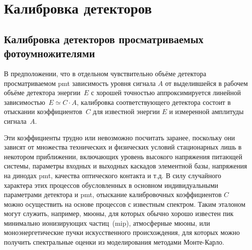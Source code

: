 \section{Калибровка детекторов}

\subsection{Калибровка детекторов просматриваемых фотоумножителями}

В предположении, что в отдельном чувствительно объёме детектора
просматриваемом \acrshort{pmt} зависимость уровня сигнала $A$ от
выделившейся в рабочем объёме детектора энергии~$E$ с хорошей
точностью аппроксимируется линейной
зависимостью~$E \simeq C \cdot A$,
калибровка соответствующего детектора состоит в отыскании
коэффициентов~$C$ для известной энергии $E$ и измеренной амплитуды
сигнала~$A$.

Эти коэффициенты трудно или невозможно посчитать заранее, поскольку
они зависят от множества технических и физических условий стационарных
лишь в некотором приближении, включающих уровень высокого напряжения
питающей системы, параметры входных и выходных каскадов элементной
базы, напряжения на динодах \acrshort{pmt}, качества оптического контакта
и т.д.
В силу случайного характера этих процессов
обусловленных в основном индивидуальными параметрами детектора
и \acrshort{pmt}, отыскание калибровочных коэффициентов $C$
можно осуществить на основе процессов с известным спектром.
Таким эталоном могут служить, например, мюоны, для которых обычно
хорошо известен пик минимально ионизирующих частиц~(\acrshort{mip}),
атмосферные мюоны, или моноэнергетические пучки искусственного
происхождения, для которых можно получить спектральные
оценки из моделирования методами Монте-Карло.


